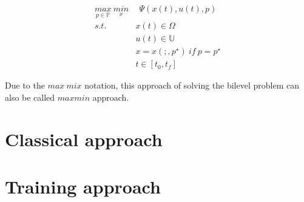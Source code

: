 \begin{equation}
	\begin{aligned}
		\underset{p \in \mathbb{P}}{max} \ \underset{x}{min} & \ \   \Psi(x(t), u(t), p) \\ 
		s.t.\ \  & x(t) \in \Omega \\
		& u(t) \in \mathbb{U}  \\
		& x = x(;,p^\star) \ if \ p = p^\star \\
		& t \in [t_0, t_f]
	\end{aligned}
	\label{P5_maxmin}
\end{equation}

Due to the $max \ mix$ notation, this approach of solving the bilevel problem can also be called $max min$ approach. 

\section{Classical approach}

\section{Training approach}
